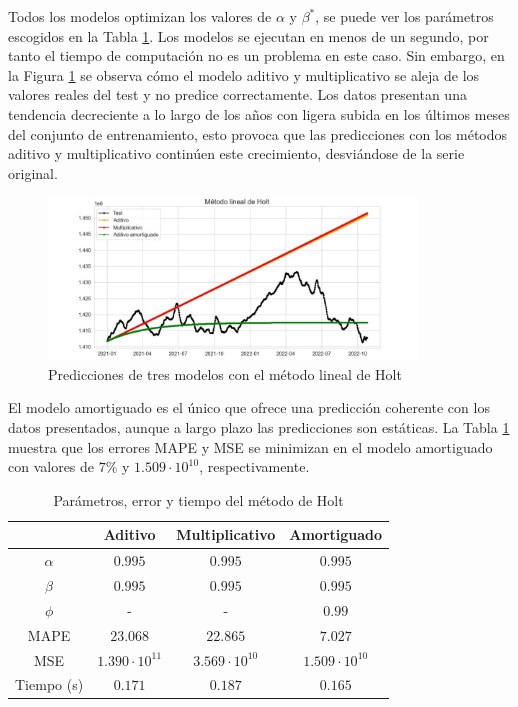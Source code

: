 \documentclass[12pt,twoside]{article}
\begin{document}
Todos los modelos optimizan los valores de $\alpha$ y $\beta^*$, se puede ver los parámetros escogidos en la Tabla \ref{tab:holt}. Los modelos se ejecutan en menos de un segundo, por tanto el tiempo de computación no es un problema en este caso. Sin embargo, en la Figura \ref{fig:Holt2} se observa cómo el modelo aditivo y multiplicativo se aleja de los valores reales del test y no predice correctamente. Los datos presentan una tendencia decreciente a lo largo de los años con ligera subida en los últimos meses del conjunto de entrenamiento, esto provoca que las predicciones con los métodos aditivo y multiplicativo continúen este crecimiento, desviándose de la serie original.
\begin{figure}[h]
    \centering
    \includegraphics[width = 0.87\textwidth]{imagenes/Holt2.jpg}
    \caption{Predicciones de tres modelos con el método lineal de Holt}\label{fig:Holt2}
\end{figure}

El modelo amortiguado es el único que ofrece una predicción coherente con los datos presentados, aunque a largo plazo las predicciones son estáticas. La Tabla \ref{tab:holt} muestra que los errores MAPE y MSE se minimizan en el modelo amortiguado con valores de $7\%$ y $1.509\cdot10^{10}$, respectivamente.



\begin{table}[ht] 
\centering
\begin{tabular}{cccc}  \hline
     & Aditivo & Multiplicativo & Amortiguado  \\ \hline
    $\alpha$ &  $0.995$ &   $0.995$ &   $0.995$ \\ 
    $\beta$ &  $0.995$ &   $0.995$ &   $0.995$ \\ 
    $\phi$ &  - &   - &   $0.99$ \\ 
      MAPE & $23.068$	 &   $22.865$ &  $7.027$ \\
      MSE & $1.390\cdot10^{11}$ & $3.569\cdot10^{10}$ & $1.509\cdot10^{10}$ \\
      Tiempo (s) & $0.171$ &   $0.187$	 &  $0.165$ \\ \hline
\end{tabular}
\caption{Parámetros, error y tiempo del método de Holt } \label{tab:holt}
\end{table}
\end{document}
